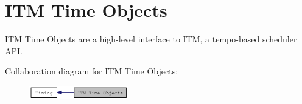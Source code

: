 \hypertarget{group__time}{
\section{ITM Time Objects}
\label{group__time}
}


ITM Time Objects are a high-\/level interface to ITM, a tempo-\/based scheduler API.  


Collaboration diagram for ITM Time Objects:\nopagebreak
\begin{figure}[H]
\begin{center}
\leavevmode
\includegraphics[width=122pt]{group__time}
\end{center}
\end{figure}
